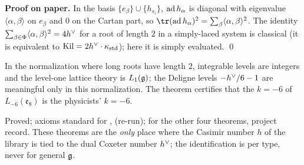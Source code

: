 \textbf{Proof on paper.} In the basis $\{e_\beta\}\cup\{h_{s_i}\}$, $\operatorname{ad} h_\alpha$ is diagonal with eigenvalue $\langle\alpha,\beta\rangle$ on
$e_\beta$ and $0$ on the Cartan part, so $\tr(\lxxiiiad h_\alpha)^2=\sum_\beta\langle\alpha,\beta\rangle^2$. The identity
$\sum_{\beta\in\Phi}\langle\alpha,\beta\rangle^2=4h^\vee$ for a root of length $2$ in a simply-laced system is classical (it is equivalent
to $\operatorname{Kil}=2h^\vee\cdot\kappa_{\mathrm{std}}$); here it is simply evaluated. \qed

\begin{physics}
In the normalization where long roots have length $2$, integrable levels are integers and the level-one lattice theory is
$L_1(\mathfrak g)$; the Deligne levels $-h^\vee/6-1$ are meaningful only in this normalization. The theorem certifies that the
$k=-6$ of $L_{-6}(\mathfrak e_8)$ is the physicists' $k=-6$.
\end{physics}

\begin{status}
Proved; axioms standard for ,  (re-run); for the other four  theorems, project record.
These theorems are the \emph{only} place where the Casimir number $h$ of the library is tied to the dual Coxeter number $h^\vee$; the
identification is per type, never for general $\mathfrak g$.
\end{status}

